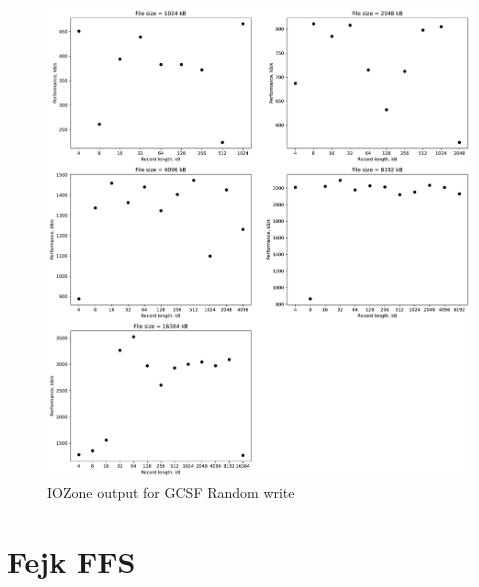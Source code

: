 \begin{figure}[!htb]
	\label{fig:app_bench_gcsf_rnd_write}
	\begin{center}
		\includegraphics[width=1.0\textwidth]{figures/benchmarking/gcsf/Random write.pdf}
	\end{center}
	\caption{IOZone output for GCSF Random write}
\end{figure}
\section{Fejk FFS}








